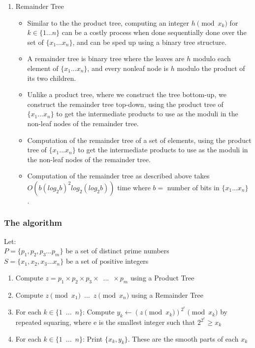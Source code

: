 \documentclass{article}
\begin{document}
\begin{enumerate}
          \item Remainder Tree \\
            \begin{itemize}
              \item Similar to the the product tree, computing an integer $h \pmod {x_k}$ for $k \in \{1 ... n\}$ can be a costly process when done sequentially done over the set of $\{x_1 ... x_n\}$, and can be sped up using a binary tree structure.
              \item A remainder tree is binary tree where the leaves are $h$ modulo each element of $\{x_1 ... x_n\}$, and every nonleaf node is $h$ modulo the product of its two children.
              \item Unlike a product tree, where we construct the tree bottom-up, we construct the remainder tree top-down, using the product tree of $\{x_1 ... x_n\}$ to get the intermediate products to use as the moduli in the non-leaf nodes of the remainder tree.
              \item Computation of the remainder tree of a set of elements, using the product tree of $\{x_1 ... x_n\}$ to get the intermediate products to use as the moduli in the non-leaf nodes of the remainder tree.
              \item Computation of the remainder tree as described above takes $O(b(log_2 b)^2log_2 (log_2 b))$ time where $b=$ number of bits in $\{x_1 ... x_n\}$ \autocite{Bernstein2004}\autocite{Bernstein2008}.
            \end{itemize}

        \end{enumerate}

        \subsubsection{The algorithm}
        Let: \\
        $P = \{p_1, p_2, p_3... p_m\}$ be a set of distinct prime numbers \\
        $S = \{x_1, x_2, x_3... x_n\}$ be a set of positive integers \\
        \begin{enumerate}
          \item Compute $z = p_1 \times p_2 \times p_3 \times \enspace ... \enspace \times p_m$ using a Product Tree
          \item Compute $z \pmod {x_1} \enspace ... \enspace z \pmod {x_n}$ using a Remainder Tree
          \item For each $k \in \{1 \enspace ... \enspace n\}$: Compute $y_k \gets (z \pmod {x_k})^{2^e} \pmod {x_k}$ by repeated squaring, where e is the smallest integer such that $2^{2^e} \geq x_k$
          \item For each $k \in \{1 \enspace ... \enspace n\}$: Print $\{x_k, y_k\}$.  These are the smooth parts of each $x_k$
        \end{enumerate}
\end{document}
